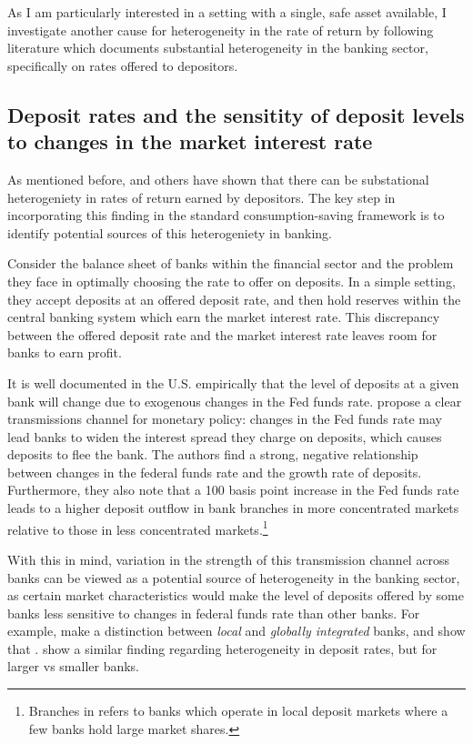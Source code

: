 \par As I am particularly interested in a setting with a single, safe asset available, I investigate another cause for heterogeneity in the rate of return  by following literature which documents substantial heterogeneity in the banking sector, specifically on rates offered to depositors.

\subsection{Deposit rates and the sensitity of deposit levels to changes in the market interest rate}

\par As mentioned before, \cite{Deuflhard2018} and others have shown that there can be substational heterogeniety in rates of return earned by depositors. The key step in incorporating this finding in the standard consumption-saving framework is to identify potential sources of this heterogeniety in banking.

\par Consider the balance sheet of banks within the financial sector and the problem they face in optimally choosing the rate to offer on deposits. In a simple setting, they accept deposits at an offered deposit rate, and then hold reserves within the central banking system which earn the market interest rate. This discrepancy between the offered deposit rate and the market interest rate leaves room for banks to earn profit.

\par It is well documented in the U.S. empirically that the level of deposits at a given bank will change due to exogenous changes in the Fed funds rate. \cite{Drechsler2017} propose a clear transmissions channel for monetary policy: changes in the Fed funds rate may lead banks to widen the interest spread they charge on deposits, which causes deposits to flee the bank. The authors find a strong, negative relationship between changes in the federal funds rate and the growth rate of deposits. Furthermore, they also note that a 100 basis point increase in the Fed funds rate leads to a higher deposit outflow in bank branches in more concentrated markets relative to those in less concentrated markets.\footnote{Branches in  refers to banks which operate in local deposit markets where a few banks hold large market shares.}

\par With this in mind, variation in the strength of this transmission channel across banks can be viewed as a potential source of heterogeneity in the banking sector, as certain market characteristics would make the level of deposits offered by some banks less sensitive to changes in federal funds rate than other banks. For example, \cite{Sarkisyan2021} make a distinction between \textit{local} and \textit{globally integrated} banks, and show that . \cite{d'Avernas2024} show a similar finding regarding heterogeneity in deposit rates, but for larger vs smaller banks.

